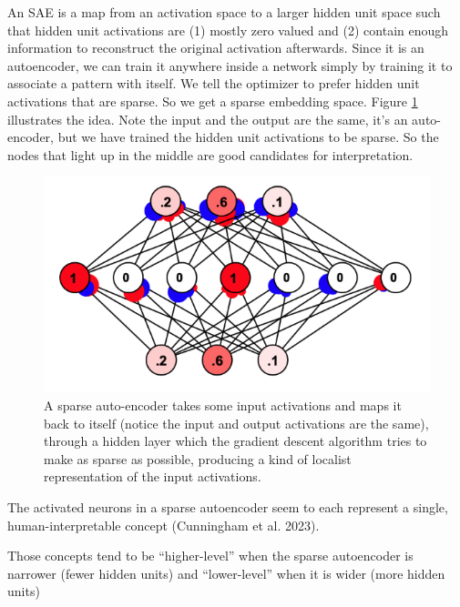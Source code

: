 An SAE is a map from an activation space to a larger hidden unit space such that hidden unit activations are (1) mostly zero valued and (2) contain enough information to reconstruct the original activation afterwards.  Since it is an autoencoder, we can train it anywhere inside a network simply by training it to associate a pattern with itself. We tell the optimizer to prefer hidden unit activations that are sparse.  So we get a sparse embedding space. Figure \ref{saeSimbrain} illustrates the idea. Note the input and the output are the same, it’s an auto-encoder, but we have trained the hidden unit activations to be sparse. So the nodes that light up in the middle are good candidates for interpretation.

\begin{figure}[h]
\centering
\includegraphics[scale=.5]{./images/saeSimbrain.png}
\caption[Simbrain screenshot from Jeff Yoshimi.]{A sparse auto-encoder takes some input activations and maps it back to itself (notice the input and output activations are the same), through a hidden layer which the gradient descent algorithm tries to make as sparse as possible, producing a kind of localist representation of the input activations.}
\label{saeSimbrain}
\end{figure}

The activated neurons in a sparse autoencoder seem to each represent a single, human-interpretable concept (Cunningham et al. 2023). 

Those concepts tend to be ``higher-level'' when the sparse autoencoder is narrower (fewer hidden units) and ``lower-level'' when it is wider (more hidden units)



